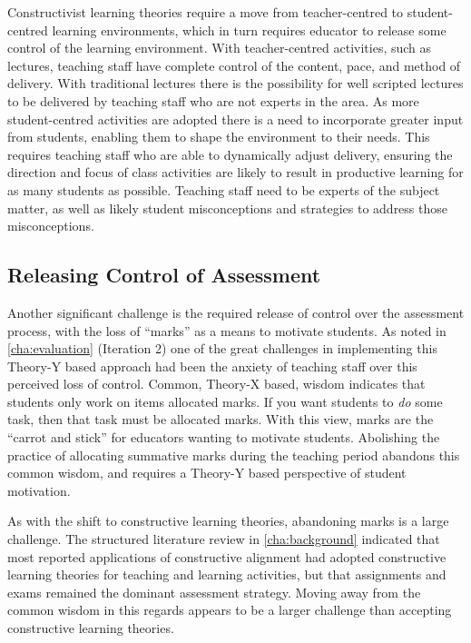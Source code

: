 Constructivist learning theories require a move from teacher-centred to student-centred learning environments, which in turn requires educator to release some control of the learning environment. With teacher-centred activities, such as lectures, teaching staff have complete control of the content, pace, and method of delivery. With traditional lectures there is the possibility for well scripted lectures to be delivered by teaching staff who are not experts in the area. As more student-centred activities are adopted there is a need to incorporate greater input from students, enabling them to shape the environment to their needs. This requires teaching staff who are able to dynamically adjust delivery, ensuring the direction and focus of class activities are likely to result in productive learning for as many students as possible. Teaching staff need to be experts of the subject matter, as well as likely student misconceptions and strategies to address those misconceptions.


\subsection{Releasing Control of Assessment} %
\label{sub:releasing_control_of_assessment}

Another significant challenge is the required release of control over the assessment process, with the loss of ``marks'' as a means to motivate students. As noted in \cref{cha:evaluation} (Iteration 2) one of the great challenges in implementing this Theory-Y based approach had been the anxiety of teaching staff over this perceived loss of control. Common, Theory-X based, wisdom indicates that students only work on items allocated marks. If you want students to \emph{do} some task, then that task must be allocated marks. With this view, marks are the ``carrot and stick'' for educators wanting to motivate students. Abolishing the practice of allocating summative marks during the teaching period abandons this common wisdom, and requires a Theory-Y based perspective of student motivation.

As with the shift to constructive learning theories, abandoning marks is a large challenge. The structured literature review in \cref{cha:background} indicated that most reported applications of constructive alignment had adopted constructive learning theories for teaching and learning activities, but that assignments and exams remained the dominant assessment strategy. Moving away from the common wisdom in this regards appears to be a larger challenge than accepting constructive learning theories.

